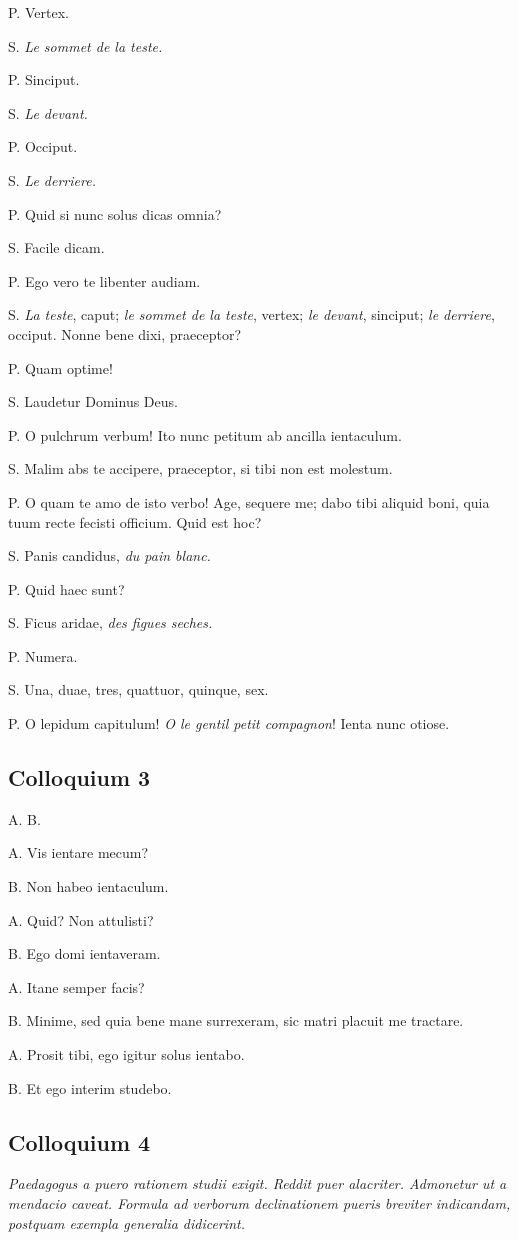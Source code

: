 \documentclass{article}
\newcommand{\fr}[1]{\foreignlanguage{french}{\emph{#1}}}
\begin{document}
P. Vertex.

S. \fr{Le sommet de la teste.}

P. Sinciput.

S. \fr{Le devant.}

P. Occiput.

S. \fr{Le derriere.}

P. Quid si nunc solus dicas omnia?

S. Facile dicam.

P. Ego vero te libenter audiam.

S. \fr{La teste}, caput; \fr{le sommet de la teste}, vertex; \fr{le devant}, sinciput; \fr{le derriere}, occiput. Nonne bene dixi, praeceptor?

P. Quam optime!

S. Laudetur Dominus Deus.

P. O pulchrum verbum! Ito nunc petitum ab ancilla ientaculum.

S. Malim abs te accipere, praeceptor, si tibi non est molestum.

P. O quam te amo de isto verbo! Age, sequere me; dabo tibi aliquid boni, quia tuum recte fecisti officium. Quid est hoc?

S. Panis candidus, \fr{du pain blanc.}

P. Quid haec sunt?

S. Ficus aridae, \fr{des figues seches.}

P. Numera.

S. Una, duae, tres, quattuor, quinque, sex.

P. O lepidum capitulum! \fr{O le gentil petit compagnon}! Ienta nunc otiose.

\subsection{Colloquium 3}
A. B.

A. Vis ientare mecum?

B. Non habeo ientaculum.

A. Quid? Non attulisti?

B. Ego domi ientaveram.

A. Itane semper facis?

B. Minime, sed quia bene mane surrexeram, sic matri placuit me tractare.

A. Prosit tibi, ego igitur solus ientabo.

B. Et ego interim studebo.

\subsection{Colloquium 4}
\emph{Paedagogus a puero rationem studii exigit. Reddit puer alacriter. Admonetur ut a mendacio caveat. Formula ad verborum declinationem pueris breviter indicandam, postquam exempla generalia didicerint.}
\end{document}
